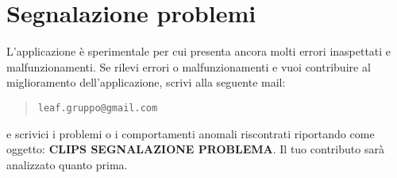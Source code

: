 \documentclass[../ClipsManualeUtente.tex]{subfiles}
\begin{document}
\section{Segnalazione problemi}
	L'applicazione è sperimentale per cui presenta ancora molti errori inaspettati e malfunzionamenti. Se rilevi errori o malfunzionamenti e vuoi contribuire al miglioramento dell'applicazione, scrivi alla seguente mail:
	\begin{quote}
		\centering
		\verb|leaf.gruppo@gmail.com|
	\end{quote}
	e scrivici i problemi o i comportamenti anomali riscontrati riportando come oggetto: \textbf{CLIPS SEGNALAZIONE PROBLEMA}.
	Il tuo contributo sarà analizzato quanto prima.
\end{document}
